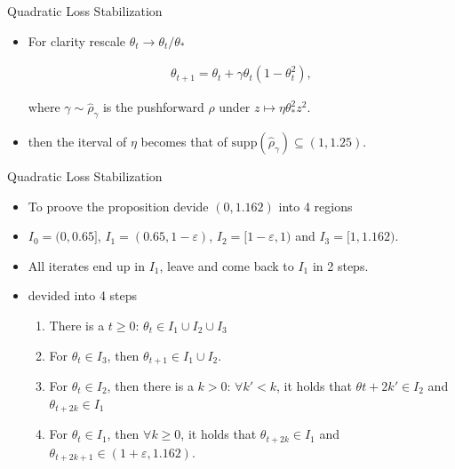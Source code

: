 \documentclass[fleqn]{beamer}
\begin{document}
    \begin{frame}{Quadratic Loss Stabilization}
        \begin{itemize}
            \item For clarity rescale $\theta_t \to \theta_t/\theta_*$
            \begin{center}
            \begin{minipage}{0.5\textwidth}
                \begin{align*}
                    \theta_{t+1} = \theta_t + \gamma\theta_t\left(
                    1-\theta_t^{2} \right),
                \end{align*}
            \end{minipage}
            \end{center}
            where $\gamma \sim \hat{\rho}_{\gamma}$ is the pushforward
            $\hat{\rho}$ under $z \mapsto \eta\theta_*^{2}z^2$.

        \item then the iterval of $\eta$ becomes that of
            $\text{supp}(\hat{\rho}_{\gamma}) \subseteq (1, 1.25)$.
        \end{itemize}
    \end{frame}

    \begin{frame}{Quadratic Loss Stabilization}
        \begin{itemize}
            \item To proove the proposition devide $(0, 1.162)$ into 4
                regions
            \item $I_0=(0, 0.65]$, $I_1=(0.65, 1-\varepsilon)$,
                $I_2=[1-\varepsilon, 1)$ and $I_3 = [1, 1.162)$.

            \item All iterates end up in $I_1$, leave and come back to $I_1$
                in 2 steps.

            \item devided into 4 steps
                \begin{enumerate}
                    \item There is a $t\ge 0$: $\theta_t \in I_1\cup
                        I_2\cup I_3$
                    \item For $\theta_t \in I_3$, then $\theta_{t+1} \in I_1
                        \cup I_2$.
                    \item For $\theta_t \in I_2$, then there is a $k>0$:
                        $\forall k' < k$, it holds that $\theta{t+2k'} \in
                        I_2$ and $\theta_{t+2k} \in I_1$
                    \item For $\theta_t \in I_1$, then $\forall k \ge 0$, it
                        holds that
                        $\theta_{t+2k} \in I_1$ and $\theta_{t+2k+1} \in
                        (1+\varepsilon, 1.162)$.
                \end{enumerate}


        \end{itemize}
    \end{frame}
\end{document}
